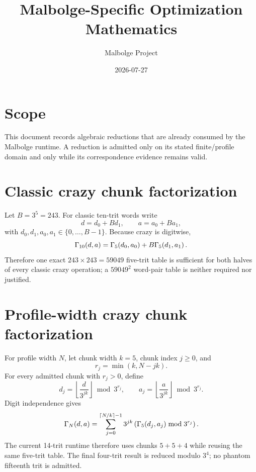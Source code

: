 \documentclass{article}
\title{Malbolge-Specific Optimization Mathematics}
\author{Malbolge Project}
\date{2026-07-27}
\begin{document}
\maketitle

\section{Scope}

This document records algebraic reductions that are already consumed by the
Malbolge runtime. A reduction is admitted only on its stated finite/profile
domain and only while its correspondence evidence remains valid.

\section{Classic crazy chunk factorization}

Let $B=3^5=243$. For classic ten-trit words write
\[
  d=d_0+B d_1,\qquad a=a_0+B a_1,
\]
with $d_0,d_1,a_0,a_1\in\{0,\ldots,B-1\}$. Because crazy is digitwise,
\begin{equation}
  \Gamma_{10}\!\left(d,a\right)
    = \Gamma_{5}\!\left(d_0,a_0\right)
      + B\Gamma_{5}\!\left(d_1,a_1\right).
  \label{eq:optimization-crazy-chunk}
\end{equation}
Therefore one exact $243\times243=59049$ five-trit table is sufficient for both
halves of every classic crazy operation; a $59049^2$ word-pair table is neither
required nor justified.

\section{Profile-width crazy chunk factorization}

For profile width $N$, let chunk width $k=5$, chunk index $j\geq0$, and
\[
  r_j=\min(k,N-jk).
\]
For every admitted chunk with $r_j>0$, define
\[
  d_j=\left\lfloor\frac{d}{3^{jk}}\right\rfloor\bmod3^{r_j},
  \qquad
  a_j=\left\lfloor\frac{a}{3^{jk}}\right\rfloor\bmod3^{r_j}.
\]
Digit independence gives
\begin{equation}
  \Gamma_{N}\!\left(d,a\right)
    = \sum_{j=0}^{\lceil N/k\rceil-1}
      3^{jk}\left(\Gamma_{5}\!\left(d_j,a_j\right)\bmod3^{r_j}\right).
  \label{eq:optimization-crazy-profile-chunks}
\end{equation}
The current 14-trit runtime therefore uses chunks $5+5+4$ while reusing the same
five-trit table. The final four-trit result is reduced modulo $3^4$; no phantom
fifteenth trit is admitted.
\end{document}
